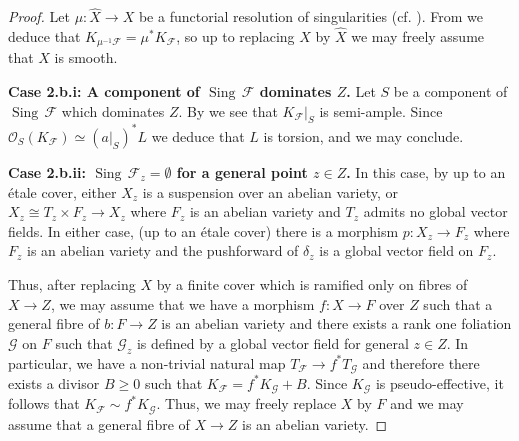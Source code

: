 \documentclass[12pt]{amsart}
\newcommand{\sing}[1]{\operatorname{Sing} \, #1}
\newcommand{\cal}[1]{\mathcal{#1}}
\begin{document}
\begin{proof}
Let $\mu\colon \widehat{X} \to X$ be a functorial resolution of singularities (cf.   \cite[Notation 4.5]{MR2581247}). 
From \cite[Corollary 4.7]{MR2581247} we deduce that $K_{\mu^{-1}\mathcal F} = \mu^*K_{\mathcal F}$, so up to replacing $X$
by $\widehat{X}$ we may freely assume that $X$ is smooth.  

\medskip 

{\bf Case 2.b.i: A component of $\sing \mathcal F$ dominates $Z$.}
Let $S$ be a component of $\sing \mathcal F$ which dominates $Z$.  By \cite[\S 4.1]{bm16}
we see that $K_{\mathcal F}|_S$ is semi-ample.  Since $\mathcal O_S(K_{\mathcal F}) \simeq (a|_S)^*L$ we deduce that 
$L$ is torsion, and we may conclude.

\medskip 

{\bf Case 2.b.ii: $\sing \mathcal F_z = \emptyset$ for a general point $z \in Z$.}
In this case, by \cite[Remark 1.5 and Theorem 3.2]{MR2928843} up to an \'etale cover, either $X_z$ is a suspension over an abelian variety, or
 $X_z \cong T_z\times F_z \to X_z$ where $F_z$ is an abelian variety and $T_z$ admits no global vector fields.
In either case, (up to an \'etale cover) there is a morphism $p\colon X_z \to F_z$ where $F_z$ is an abelian variety and the pushforward of $\delta_z$ is a global vector field on $F_z$.



Thus, after replacing $X$ by a finite cover which is ramified only on fibres of $X \to Z$, we may assume that we have a morphism $f\colon X \to F$ over $Z$ such that a general fibre of $b\colon F \to Z$ is an abelian variety
and there exists a rank one foliation $\mathcal G$ on $F$ such that $\mathcal G_z$ is defined by a global vector field for general $z \in Z$. In particular, we have a non-trivial natural map $T_{\cal F}\to f^*T_{\cal G}$ and therefore there exists a divisor $B\ge 0$ such that $K_{\cal F}=f^*K_{\cal G}+B$. Since $K_{\cal G}$ is pseudo-effective, it follows that $K_{\mathcal F} \sim f^*K_{\mathcal G}$.  
Thus, we may freely replace $X$ by $F$ and  we may assume that a general fibre of $X \to Z$ is an abelian variety.


\end{proof}
\end{document}
